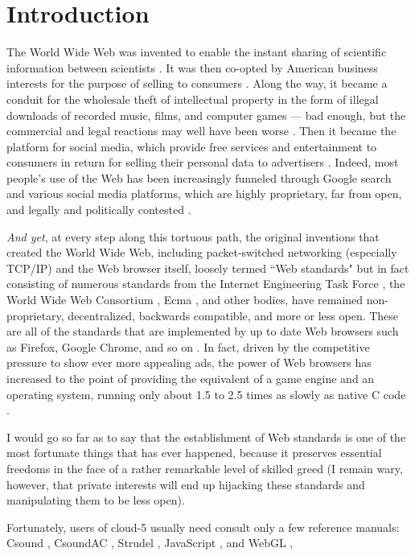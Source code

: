 \documentclass[runningheads,a4paper]{llncs}
\begin{document}
\section{Introduction}

The World Wide Web was invented to enable the instant sharing of scientific information between scientists \cite{www}. It was then co-opted by American business interests for the purpose of selling to consumers \cite{gore}. Along the way, it became a conduit for the wholesale theft of intellectual property in the form of illegal downloads of recorded music, films, and computer games --- bad enough, but the commercial and legal reactions may well have been worse \cite{freeculture}. Then it became the platform for social media, which provide free services and entertainment to consumers in return for selling their personal data to advertisers \cite{socialmedia}. Indeed, most people's use of the Web has been increasingly funneled through Google search and various social media platforms, which are highly proprietary, far from open, and legally and politically contested \cite{surveillance}. 

\emph{And yet}, at every step along this tortuous path, the original inventions that created the World Wide Web, including packet-switched networking (especially TCP/IP) and the Web browser itself, loosely termed ``Web standards" but in fact consisting of numerous standards from the Internet Engineering Task Force \cite{ietf}, the World Wide Web Consortium \cite{w3c}, Ecma \cite{ecma}, and other bodies, have remained non-proprietary, decentralized, backwards compatible, and more or less open. These are all of the standards that are implemented by up to date Web browsers such as Firefox, Google Chrome, and so on \cite{html5test}. In fact, driven by the competitive pressure to show ever more appealing ads, the power of Web browsers has increased to the point of providing the equivalent of a game engine and an operating system, running only about 1.5 to 2.5  times as slowly as native C code \cite{wasmspeed}. 

I would go so far as to say that the establishment of Web standards is one of the most fortunate things that has ever happened, because it preserves essential freedoms in the face of a rather remarkable level of skilled greed (I remain wary, however, that private interests will end up hijacking these standards and manipulating them to be less open).

Fortunately, users of cloud-5 usually need consult only a few reference manuals: Csound \cite{csoundreference} \cite{csoundapireference}, CsoundAC \cite{csoundacreference}, Strudel \cite{strudel}, JavaScript \cite{javascriptreference}, and WebGL \cite{webglreference}, 
\end{document}

